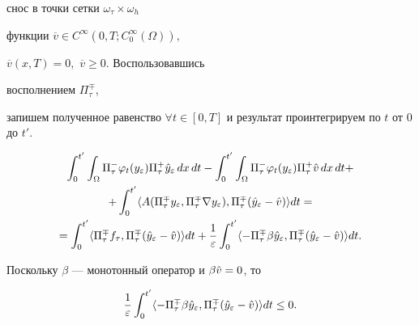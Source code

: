 снос в точки сетки $\omega_\tau \times \omega_h$


функции $\overline{v} \in C^{\infty}(0,T;C^{\infty}_0(\Omega)),$


$\overline{v}(x,T)=0,$ $\overline{v} \ge 0$. Воспользовавшись


восполнением $\Pi^{\mp}_\tau$,


запишем полученное равенство $\forall t 


\in [0,T]$ и результат проинтегрируем по $t$ от $0$ до $t'$.


\begin{gather}


 \int^{t'}_{0} \int_{\Omega}


 \Pi^{-}_{\tau} \varphi_t(y_\varepsilon) \Pi^{+}_{\tau}\Hat{y}_\varepsilon\,


 dx \,dt -


 \int^{t'}_{0} \int_{\Omega}


 \Pi^{-}_{\tau} \varphi_t(y_\varepsilon)\Pi^{+}_{\tau}\Hat{v}\, dx\, dt+\notag\\


%


 + \int^{t'}_{0} \langle A(\Pi^{\mp}_{\tau}y_\varepsilon,


 \Pi^{\mp}_{\tau} \nabla {y}_\varepsilon),


 \Pi^{\mp}_{\tau} (\Hat{y}_\varepsilon - \Hat{v} ) \rangle dt =\notag\\


%


= \int^{t'}_{0} \langle \Pi^{\mp}_{\tau} f_\tau,


  \Pi^{\mp}_{\tau} (\Hat{y}_\varepsilon - \Hat{v} )  \rangle dt +


\frac{1}{\varepsilon}


  \int^{t'}_{0} \langle - \Pi^{\mp}_{\tau} \beta


  \Hat{y}_\varepsilon,\Pi^{\mp}_{\tau} (\Hat{y}_\varepsilon -\Hat{v})\rangle dt.


\label{***}


\end{gather}


Поскольку $\beta$ --- монотонный оператор и $\beta \Hat{v} = 0 $, то


\begin{equation}


 \frac{1}{\varepsilon}


\int^{t'}_{0}


\langle - \Pi^{\mp}_{\tau} \beta\Hat{y}_\varepsilon,


\Pi^{\mp}_{\tau} (\Hat{y}_\varepsilon - \Hat{v} ) \rangle dt \le 0 .


\label{bb}


\end{equation}


